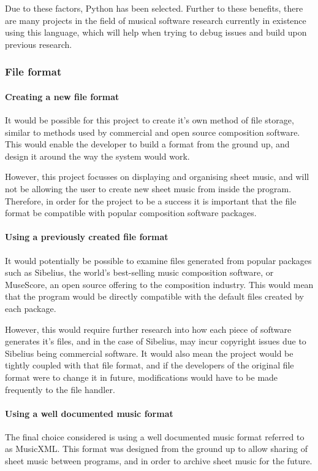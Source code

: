 Due to these factors, Python has been selected. Further to these benefits, there are many projects in the field of musical software research currently in existence using this language, \parencite{pmus} which will help when trying to debug issues and build upon previous research.

\subsubsection{File format}
\paragraph{Creating a new file format}

It would be possible for this project to create it's own method of file storage, similar to methods used by commercial and open source composition software. This would enable the developer to build a format from the ground up, and design it around the way the system would work.

However, this project focusses on displaying and organising sheet music, and will not be allowing the user to create new sheet music from inside the program. Therefore, in order for the project to be a success it is important that the file format be compatible with popular composition software packages.

\paragraph{Using a previously created file format}

It would potentially be possible to examine files generated from popular packages such as Sibelius, the world's best-selling music composition software, \parencite{avid} or MuseScore, an open source offering to the composition industry. This would mean that the program would be directly compatible with the default files created by each package.

However, this would require further research into how each piece of software generates it's files, and in the case of Sibelius, may incur copyright issues due to Sibelius being commercial software. It would also mean the project would be tightly coupled with that file format, and if the developers of the original file format were to change it in future, modifications would have to be made frequently to the file handler.

\paragraph{Using a well documented music format}
The final choice considered is using a well documented music format referred to as MusicXML. This format was designed from the ground up to allow sharing of sheet music between programs, and in order to archive sheet music for the future. \parencite{mxml}


